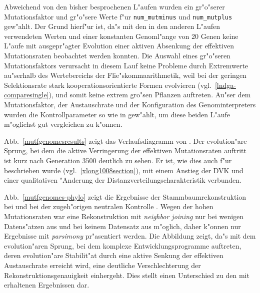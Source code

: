 Abweichend von den bisher besprochenen L"aufen wurden ein gr"o"serer Mutationsfaktor und gr"o"sere Werte f"ur
\verb|num_mutminus| und \verb|num_mutplus| gew"ahlt. Der Grund hierf"ur ist, da"s mit den in den anderen L"aufen
verwendeten Werten und einer konstanten Genoml"ange von 20 Genen keine L"aufe mit ausgepr"agter Evolution einer
aktiven Absenkung der effektiven Mutationsraten beobachtet werden konnten. Die Auswahl eines gr"o"seren Mutationsfaktors
verursacht in diesem Lauf keine Probleme durch Extremwerte au"serhalb des Wertebereichs der Flie"skommaarithmetik,
weil bei der geringen Selektionsrate stark kooperationsorientierte Formen evolvieren (vgl.\ \ref{lndga-comparesingle}),
und somit keine extrem gro"sen Pflanzen auftreten. Au"ser dem Mutationsfaktor, der Austauschrate und der Konfiguration
des Genominterpreters wurden die Kontrollparameter so wie in  gew"ahlt, um diese beiden L"aufe
m"oglichst gut vergleichen zu k"onnen.

Abb.\ \ref{mutfgenomesresults} zeigt das Verlaufsdiagramm von . Der evolution"are Sprung,
bei dem die aktive Verringerung der effektiven Mutationsraten auftritt ist kurz nach Generation 3500 deutlich zu
sehen. Er ist, wie dies auch f"ur  beschrieben wurde (vgl.\ \ref{xlong1008section}), mit einem
Anstieg der DVK und einer qualitativen "Anderung der Distanzverteilungscharakteristik verbunden.

Abb.\ \ref{mutfgenomes-phylo} zeigt die Ergebnisse der Stammbaumrekonstruktion bei  und bei der
zugeh"origen neutralen Kontrolle . Wegen der hohen Mutationsraten war eine Rekonstruktion
mit \textsl{neighbor joining} nur bei wenigen Datens"atzen aus  und bei keinem Datensatz aus
 m"oglich, daher k"onnen nur Ergebnisse mit \textsl{parsimony} pr"asentiert werden. Die Abbildung
zeigt, da"s mit dem evolution"aren Sprung, bei dem komplexe Entwicklungsprogramme auftreten, deren evolution"are
Stabilit"at durch eine aktive Senkung der effektiven Austauschrate erreicht wird, eine deutliche Verschlechterung
der Rekonstruktionsgenauigkeit einhergeht. Dies stellt einen Unterschied zu den mit  erhaltenen
Ergebnissen dar.

